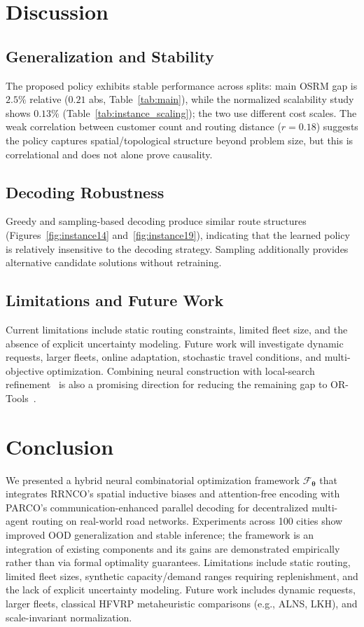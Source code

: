 \documentclass[journal,twoside,web]{ieeecolor}
\theoremstyle{definition}
\theoremstyle{remark}
\theoremstyle{definition}
\begin{document}
\section{Discussion}

\subsection{Generalization and Stability}

The proposed policy exhibits stable performance across splits: main OSRM gap is $2.5\%$ relative ($0.21$ abs, Table~\ref{tab:main}), while the normalized scalability study shows $0.13\%$ (Table~\ref{tab:instance_scaling}); the two use different cost scales. The weak correlation between customer count and routing distance ($r=0.18$) suggests the policy captures spatial/topological structure beyond problem size, but this is correlational and does not alone prove causality.

\subsection{Decoding Robustness}

Greedy and sampling-based decoding produce similar route structures (Figures~\ref{fig:instance14} and~\ref{fig:instance19}), indicating that the learned policy is relatively insensitive to the decoding strategy. Sampling additionally provides alternative candidate solutions without retraining.

\subsection{Limitations and Future Work}

Current limitations include static routing constraints, limited fleet size, and the absence of explicit uncertainty modeling. Future work will investigate dynamic requests, larger fleets, online adaptation, stochastic travel conditions, and multi-objective optimization. Combining neural construction with local-search refinement~\cite{hottung2022efficient} is also a promising direction for reducing the remaining gap to OR-Tools~\cite{ortools}.

\section{Conclusion}

We presented a hybrid neural combinatorial optimization framework $\mathcal{F}_{\boldsymbol{\theta}}$ that integrates RRNCO's spatial inductive biases and attention-free encoding with PARCO's communication-enhanced parallel decoding for decentralized multi-agent routing on real-world road networks. Experiments across 100 cities show improved OOD generalization and stable inference; the framework is an integration of existing components and its gains are demonstrated empirically rather than via formal optimality guarantees. Limitations include static routing, limited fleet sizes, synthetic capacity/demand ranges requiring replenishment, and the lack of explicit uncertainty modeling. Future work includes dynamic requests, larger fleets, classical HFVRP metaheuristic comparisons (e.g., ALNS, LKH), and scale-invariant normalization.
\end{document}
